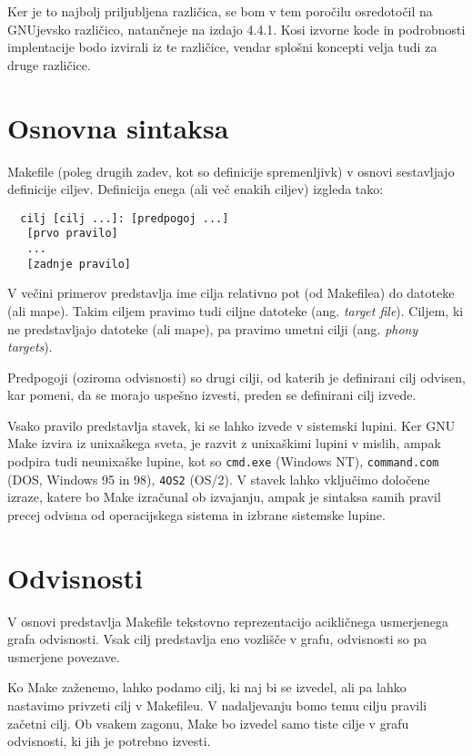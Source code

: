 \documentclass[notitlepage]{report}
\begin{document}
Ker je to najbolj priljubljena različica, se bom v tem poročilu
osredotočil na GNUjevsko različico, natančneje na izdajo 4.4.1. Kosi
izvorne kode in podrobnosti implentacije bodo izvirali iz te
različice, vendar splošni koncepti velja tudi za druge različice.

\section*{Osnovna sintaksa}

Makefile (poleg drugih zadev, kot so definicije spremenljivk) v osnovi
sestavljajo definicije ciljev. Definicija enega (ali več enakih
ciljev) izgleda tako:

\begin{verbatim}
  cilj [cilj ...]: [predpogoj ...]
   [prvo pravilo]
   ...
   [zadnje pravilo]
\end{verbatim}

V večini primerov predstavlja ime cilja relativno pot (od Makefilea)
do datoteke (ali mape). Takim ciljem pravimo tudi ciljne datoteke
(ang. \textit{target file}). Ciljem, ki ne predstavljajo datoteke (ali
mape), pa pravimo umetni cilji (ang. \textit{phony targets}).

Predpogoji (oziroma odvisnosti) so drugi cilji, od katerih je
definirani cilj odvisen, kar pomeni, da se morajo uspešno izvesti,
preden se definirani cilj izvede.

Vsako pravilo predstavlja stavek, ki se lahko izvede v sistemski
lupini. Ker GNU Make izvira iz unixaškega sveta, je razvit z
unixaškimi lupini v mislih, ampak podpira tudi neunixaške lupine, kot
so \verb|cmd.exe| (Windows NT), \verb|command.com| (DOS, Windows 95 in
98), \verb|4OS2| (OS/2). V stavek lahko vključimo določene izraze,
katere bo Make izračunal ob izvajanju, ampak je sintaksa samih pravil
precej odvisna od operacijskega sistema in izbrane sistemske lupine.

\section*{Odvisnosti}

V osnovi predstavlja Makefile tekstovno reprezentacijo acikličnega
usmerjenega grafa odvisnosti. Vsak cilj predstavlja eno vozlišče v
grafu, odvisnosti so pa usmerjene povezave.

Ko Make zaženemo, lahko podamo cilj, ki naj bi se izvedel, ali pa
lahko nastavimo privzeti cilj v Makefileu. V nadaljevanju bomo temu
cilju pravili začetni cilj. Ob vsakem zagonu, Make bo izvedel samo
tiste cilje v grafu odvisnosti, ki jih je potrebno izvesti.
\end{document}

